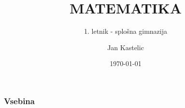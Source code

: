 \documentclass[10pt, aspectratio=169]{beamer}
\title{MATEMATIKA}
\subtitle{1. letnik - splošna gimnazija}
\date{\today}
\author{Jan Kastelic}
\institute[FMF]{Fakulteta za matematiko in fiziko, \\ Univerza v Ljubljani}
\begin{document}
\begin{frame}
	\titlepage
\end{frame}
	

\begin{frame}
	\frametitle{Vsebina}
	\tableofcontents
\end{frame}
	

\end{document}
